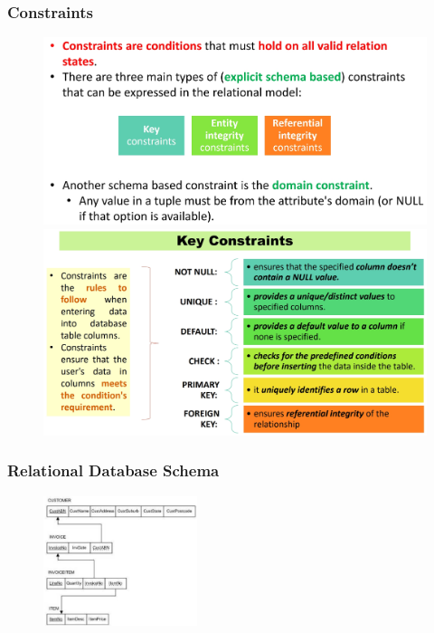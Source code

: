 \documentclass[a4paper, 12pt]{article}
\begin{document}
    \subsubsection{Constraints}
    \begin{figure}[H]
        \includegraphics[width=\textwidth]{chapter1a_4.png}
        \includegraphics[width=\textwidth]{chapter1a_5.png}
    \end{figure}
    \subsubsection{Relational Database Schema}
    \begin{figure}[H]
        \includegraphics[width=0.4\textwidth]{chapter1a_6.png}
    \end{figure}
\end{document}
